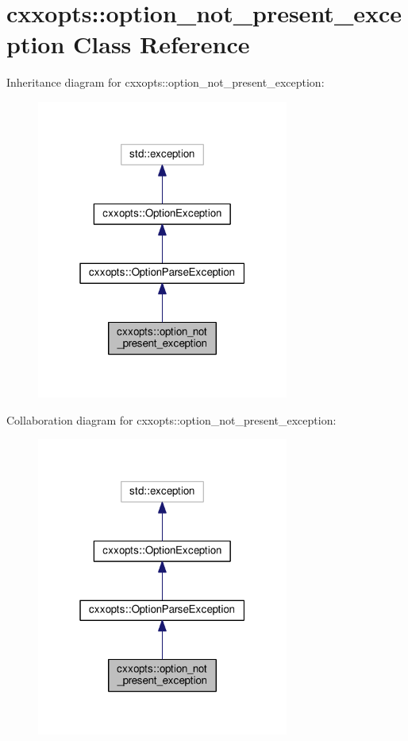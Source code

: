 \hypertarget{classcxxopts_1_1option__not__present__exception}{}\section{cxxopts\+:\+:option\+\_\+not\+\_\+present\+\_\+exception Class Reference}
\label{classcxxopts_1_1option__not__present__exception}


Inheritance diagram for cxxopts\+:\+:option\+\_\+not\+\_\+present\+\_\+exception\+:
\nopagebreak
\begin{figure}[H]
\begin{center}
\leavevmode
\includegraphics[width=235pt]{classcxxopts_1_1option__not__present__exception__inherit__graph}
\end{center}
\end{figure}


Collaboration diagram for cxxopts\+:\+:option\+\_\+not\+\_\+present\+\_\+exception\+:
\nopagebreak
\begin{figure}[H]
\begin{center}
\leavevmode
\includegraphics[width=235pt]{classcxxopts_1_1option__not__present__exception__coll__graph}
\end{center}
\end{figure}
